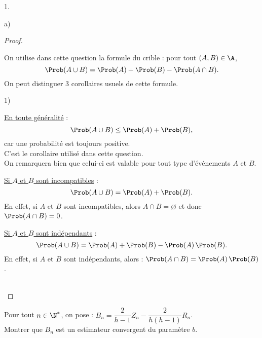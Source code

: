 \documentclass[11pt]{article}%
\begin{document}
\begin{noliste}{1.}
\begin{noliste}{a)}
\begin{proof}
      \begin{remark}%
        On utilise dans cette question la formule du crible : pour
        tout $(A,B)\in\A$,
        \[
        \Prob(A\cup B) = \Prob(A) + \Prob(B) - \Prob(A\cap B).
        \]
        On peut distinguer $3$ corollaires usuels de cette formule.
        \begin{noliste}{1)}
        \item \underline{En toute généralité} :
          \[
          \Prob(A\cup B) \leq \Prob(A) + \Prob(B),
          \]
          car une probabilité est toujours positive. \\
          C'est le
          corollaire utilisé dans cette question.\\
          On remarquera bien que celui-ci est valable pour tout
          type d'événements $A$ et $B$.
        \item \underline{Si $A$ et $B$ sont incompatibles} :
          \[
          \Prob(A\cup B) = \Prob(A) + \Prob(B).
          \]
          En effet, si $A$ et $B$ sont incompatibles, alors $A\cap
          B = \varnothing$ et donc $\Prob(A\cap B)=0$.
        \item \underline{Si $A$ et $B$ sont indépendants} :
          \[
          \Prob(A\cup B)=\Prob(A)+\Prob(B)-\Prob(A) \, \Prob(B).
          \]
          En effet, si $A$ et $B$ sont indépendants, alors :
          $\Prob(A\cap B) = \Prob(A) \, \Prob(B)$.
        \end{noliste}
      \end{remark}~\\[-1.4cm]
    \end{proof}
    
  \item Pour tout $n\in\N^*$, on pose : $B_n=\dfrac{2}{h-1}Z_n -
    \dfrac{2}{h(h-1)}R_n$.\\
    Montrer que $B_n$ est un estimateur convergent du paramètre $b$.
    

\end{noliste}
\end{noliste}
\end{document}

